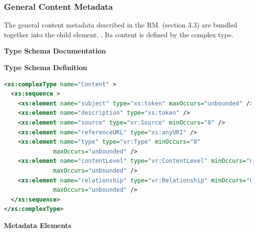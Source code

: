 \documentclass[11pt,a4paper]{ivoa}
\begin{document}
\endgroup



\subsubsection{General Content Metadata}


The general content metadata described in the RM.
(section 3.3) are bundled together into the 
child element, .  Its content is
defined by the  complex type.


\begingroup
      	\renewcommand*\descriptionlabel[1]{%
      	\hbox to 5.5em{\emph{#1}\hfil}}\vspace{2ex}\noindent\textbf{ Type Schema Documentation}


\vspace{1ex}\noindent\textbf{ Type Schema Definition}

\begin{lstlisting}[language=XML,basicstyle=\footnotesize]
<xs:complexType name="Content" >
  <xs:sequence >
    <xs:element name="subject" type="xs:token" maxOccurs="unbounded" />
    <xs:element name="description" type="xs:token" />
    <xs:element name="source" type="vr:Source" minOccurs="0" />
    <xs:element name="referenceURL" type="xs:anyURI" />
    <xs:element name="type" type="vr:Type" minOccurs="0"
              maxOccurs="unbounded" />
    <xs:element name="contentLevel" type="vr:ContentLevel" minOccurs="0"
              maxOccurs="unbounded" />
    <xs:element name="relationship" type="vr:Relationship" minOccurs="0"
              maxOccurs="unbounded" />
  </xs:sequence>
</xs:complexType>
\end{lstlisting}

\vspace{0.5ex}\noindent\textbf{ Metadata Elements}
\end{document}
